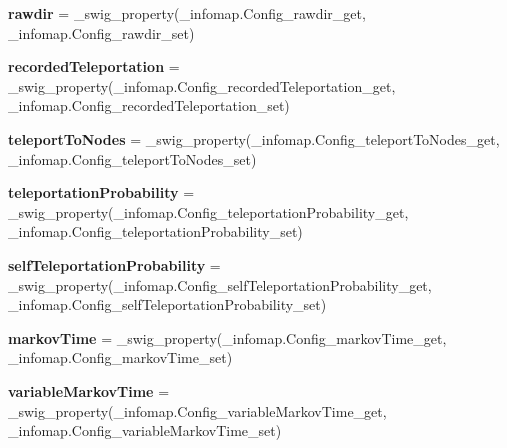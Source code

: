 \begin{DoxyCompactItemize}
{\bfseries rawdir} = \+\_\+swig\+\_\+property(\+\_\+infomap.\+Config\+\_\+rawdir\+\_\+get, \+\_\+infomap.\+Config\+\_\+rawdir\+\_\+set)
\item 
\mbox{\label{classdsmacc_1_1graph_1_1infomap_1_1Config_a0829974b1fcfe97fcddc0d0b6c6786d3}} 
{\bfseries recorded\+Teleportation} = \+\_\+swig\+\_\+property(\+\_\+infomap.\+Config\+\_\+recorded\+Teleportation\+\_\+get, \+\_\+infomap.\+Config\+\_\+recorded\+Teleportation\+\_\+set)
\item 
\mbox{\label{classdsmacc_1_1graph_1_1infomap_1_1Config_aa183788c6893f37e05892520f076eb8e}} 
{\bfseries teleport\+To\+Nodes} = \+\_\+swig\+\_\+property(\+\_\+infomap.\+Config\+\_\+teleport\+To\+Nodes\+\_\+get, \+\_\+infomap.\+Config\+\_\+teleport\+To\+Nodes\+\_\+set)
\item 
\mbox{\label{classdsmacc_1_1graph_1_1infomap_1_1Config_ace4c753b16d081751361095ce0d82ad1}} 
{\bfseries teleportation\+Probability} = \+\_\+swig\+\_\+property(\+\_\+infomap.\+Config\+\_\+teleportation\+Probability\+\_\+get, \+\_\+infomap.\+Config\+\_\+teleportation\+Probability\+\_\+set)
\item 
\mbox{\label{classdsmacc_1_1graph_1_1infomap_1_1Config_a5c5c9d50141516ccdba01e7be43af432}} 
{\bfseries self\+Teleportation\+Probability} = \+\_\+swig\+\_\+property(\+\_\+infomap.\+Config\+\_\+self\+Teleportation\+Probability\+\_\+get, \+\_\+infomap.\+Config\+\_\+self\+Teleportation\+Probability\+\_\+set)
\item 
\mbox{\label{classdsmacc_1_1graph_1_1infomap_1_1Config_a190ea388d2fd829010df00fae65f6556}} 
{\bfseries markov\+Time} = \+\_\+swig\+\_\+property(\+\_\+infomap.\+Config\+\_\+markov\+Time\+\_\+get, \+\_\+infomap.\+Config\+\_\+markov\+Time\+\_\+set)
\item 
\mbox{\label{classdsmacc_1_1graph_1_1infomap_1_1Config_aa1bca577f2cc4ddf8e4ccece22751645}} 
{\bfseries variable\+Markov\+Time} = \+\_\+swig\+\_\+property(\+\_\+infomap.\+Config\+\_\+variable\+Markov\+Time\+\_\+get, \+\_\+infomap.\+Config\+\_\+variable\+Markov\+Time\+\_\+set)

\end{DoxyCompactItemize}

